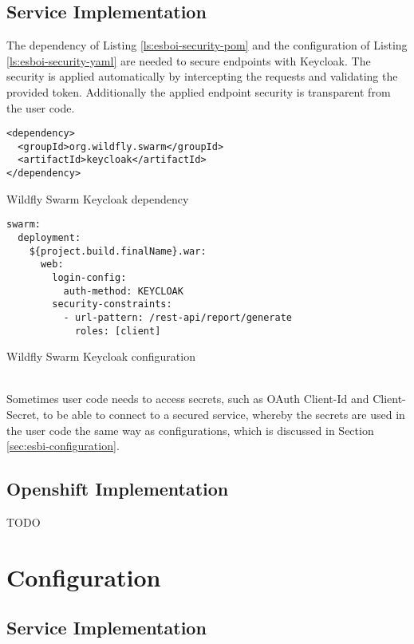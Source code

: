 \subsection{Service Implementation}
\label{sec:esbi-security-service}
The dependency of Listing \vref{ls:esboi-security-pom} and the configuration of Listing \vref{ls:esboi-security-yaml} are needed to secure endpoints with Keycloak. The security is applied automatically by intercepting the requests and validating the provided token. Additionally the applied endpoint security is transparent from the user code. 
\begin{listing}
\begin{verbatim}
<dependency>
  <groupId>org.wildfly.swarm</groupId>
  <artifactId>keycloak</artifactId>
</dependency>
\end{verbatim}
\caption{Wildfly Swarm Keycloak dependency}
\label{ls:esboi-security-pom}
\end{listing}
\begin{listing}
	\begin{verbatim}
swarm:
  deployment:
    ${project.build.finalName}.war:
      web:
        login-config:
          auth-method: KEYCLOAK
        security-constraints:
          - url-pattern: /rest-api/report/generate
            roles: [client]
\end{verbatim}
\caption{Wildfly Swarm Keycloak configuration}
\label{ls:esboi-security-yaml}
\end{listing}
\ \\
Sometimes user code needs to access secrets, such as OAuth Client-Id and Client-Secret, to be able to connect to a secured service, whereby the secrets are used in the user code the same way as configurations, which is discussed in Section \vref{sec:esbi-configuration}.

\subsection{Openshift Implementation}
\label{sec:esbi-security-openshift}
TODO

\section{Configuration}
\label{sec:esbi-configuration}

\subsection{Service Implementation}
\label{sec:esbi-config-service}

